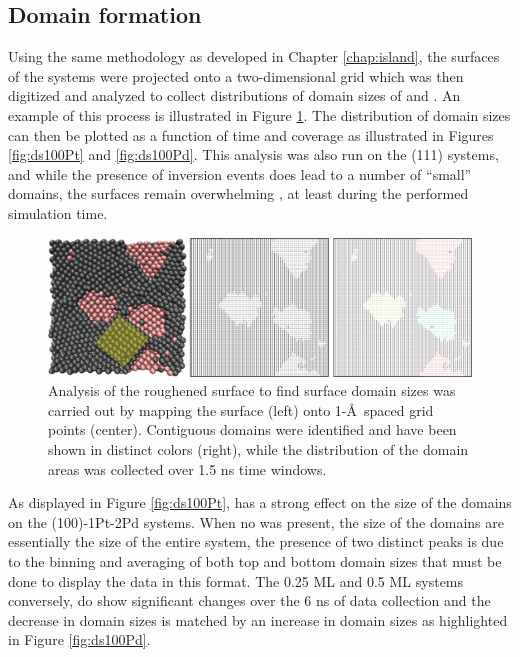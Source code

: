 \subsection{Domain formation}
Using the same methodology as developed in Chapter \ref{chap:island},
the surfaces of the systems were projected onto a two-dimensional grid which
was then digitized and analyzed to collect distributions of domain sizes of
 and . An example of this process is illustrated in Figure
\ref{fig:surfaceGrid}. 
The distribution of domain sizes can then be plotted as a
function of time and  coverage as illustrated in Figures
\ref{fig:ds100Pt} and \ref{fig:ds100Pd}. This analysis was also run on the
(111) systems, and while the presence of inversion events does lead to a number
of ``small''  domains, the surfaces remain overwhelming , at
least during the performed simulation time.

\begin{landscape}
\begin{figure}[p!]
\centering
  \includegraphics[width=\linewidth]{../figures/appD/grid_small.pdf}
  \caption{Analysis of the roughened surface to find surface domain sizes was
carried out by mapping the surface (left) onto 1-\AA\ spaced grid
points (center). Contiguous domains were identified and have been shown in
distinct colors (right), while the distribution of the domain areas was collected
over 1.5 ns time windows.}
\label{fig:surfaceGrid}
\end{figure}
\end{landscape}

As displayed in Figure \ref{fig:ds100Pt},  has a strong effect on the
size of the  domains on the (100)-1Pt-2Pd systems. When no  was
present, the size of the domains are essentially the size of the entire system,
the presence of two distinct peaks is due to the binning and averaging of both
top and bottom domain sizes that must be done to display the data in this
format. The 0.25 ML and 0.5 ML systems conversely, do show significant changes
over the 6 ns of data collection and the decrease in  domain sizes is
matched by an increase in  domain sizes as highlighted in
Figure \ref{fig:ds100Pd}. 

